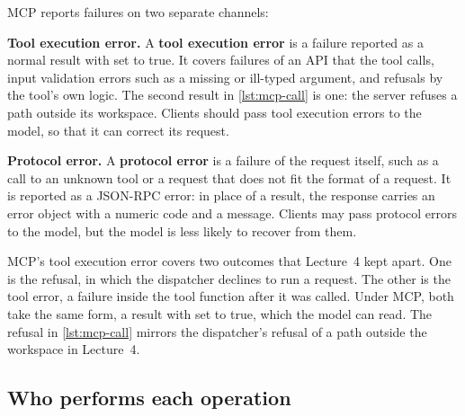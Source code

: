 MCP reports failures on two separate channels:
\bi
\item \textbf{Tool execution error.} A \textbf{tool execution error} is a failure reported as a
normal result with  set to true. It covers failures of an API that the tool calls,
input validation errors such as a missing or ill-typed argument, and refusals by the tool's own
logic. The second result in \cref{lst:mcp-call} is one: the server refuses a path outside its
workspace. Clients should pass tool execution errors to the model, so that it can correct its
request.
\item \textbf{Protocol error.} A \textbf{protocol error} is a failure of the request itself, such as
a call to an unknown tool or a request that does not fit the format of a 
request. It is reported as a JSON-RPC error: in place of a result, the response carries an error
object with a numeric code and a message. Clients may pass protocol errors to the model, but the
model is less likely to recover from them.
\ei

MCP's tool execution error covers two outcomes that Lecture~4 kept apart. One is the refusal, in
which the dispatcher declines to run a request. The other is the tool error, a failure inside the
tool function after it was called. Under MCP, both take the same form, a result with
 set to true, which the model can read. The
refusal in \cref{lst:mcp-call} mirrors the dispatcher's refusal of a path outside the workspace in
Lecture~4.

\subsection{Who performs each operation}
\label{sec:mcp-operations}

